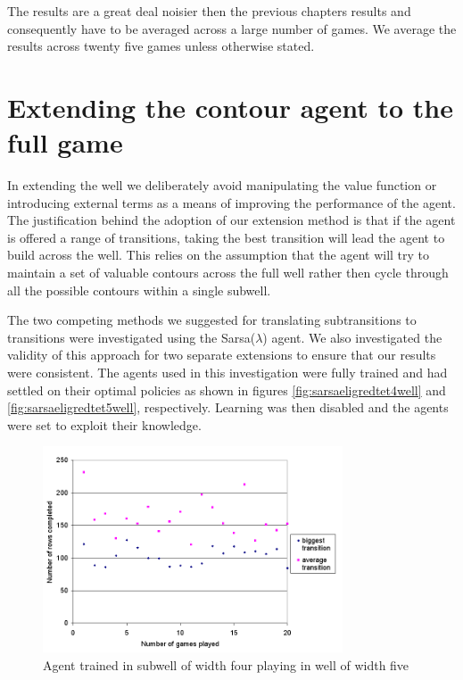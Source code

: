 \documentclass{rucsthesis}
\begin{document}
The results are a great deal noisier then the previous chapters results and consequently have to be averaged across a large number of games. We average the results across twenty five games unless otherwise stated.

\section{Extending the contour agent to the full game \label{m2s}}

In extending the well we deliberately avoid manipulating the value function or introducing external terms as a means of improving the performance of the agent. The justification behind the adoption of our extension method is that if the agent is offered a range of transitions, taking the best transition will lead the agent to build across the well. This relies on the assumption that the agent will try to maintain a set of valuable contours across the full well rather then cycle through all the possible contours within a single subwell.

The two competing methods we suggested for translating subtransitions to transitions were investigated using the Sarsa($\lambda$) agent. We also investigated the validity of this approach for two separate extensions to ensure that our results were consistent. The agents used in this investigation were fully trained and had settled on their optimal policies as shown in figures \ref{fig:sarsaeligredtet4well} and \ref{fig:sarsaeligredtet5well}, respectively. Learning was then disabled and the agents were set to exploit their knowledge.

\begin{figure}[h]
\centering
\includegraphics[width=3.5in]{multisingle45.png}
\caption{Agent trained in subwell of width four playing in well of width five}
\label{fig:multisingle45}
\end{figure}
\end{document}
